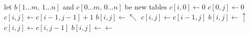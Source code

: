 \begin{algorithmic}
\State let $b[1\ldots m,\,1\ldots n]$ and $c[0\ldots m,\,0\ldots n]$ be new tables
  \State $c[i,0] \gets 0$
\EndFor
{}
  \State $c[0,j] \gets 0$
\EndFor
{}
      \State $c[i,j] \gets c[i-1,j-1] + 1$
      \State $b[i,j] \gets \nwarrow$
      \State $c[i,j] \gets c[i-1,j]$
      \State $b[i,j] \gets \uparrow$
    \Else
      \State $c[i,j] \gets c[i,j-1]$
      \State $b[i,j] \gets \leftarrow$
    \EndIf
  \EndFor
\EndFor
\State {}
\EndFunction
\end{algorithmic}